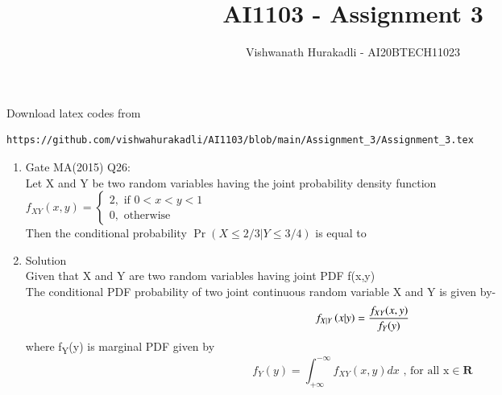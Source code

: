 \documentclass[journal,12pt,twocolumn]{IEEEtran}
\begin{document}
     \def\centbox#1{\makebox[0in]{#1}}
     \def\topbox#1{\raisebox{-\baselineskip}[0in][0in]{#1}}
     \def\midbox#1{\raisebox{-0.5\baselineskip}[0in][0in]{#1}}
\vspace{3cm}
\title{AI1103 - Assignment 3}
\author{Vishwanath Hurakadli - AI20BTECH11023}
\maketitle
\newpage
\bigskip
\renewcommand{\thefigure}{\theenumi}
\renewcommand{\thetable}{\theenumi}
%
Download latex codes from 
%
\begin{lstlisting}
https://github.com/vishwahurakadli/AI1103/blob/main/Assignment_3/Assignment_3.tex
\end{lstlisting}
\begin{enumerate}
\item Gate MA(2015) Q26:\\
Let X and Y be two random variables having the joint probability density function\\
$f_{XY}(x,y)= \begin{cases}
2, \text{ if } 0<x<y<1\\
0,\text{ otherwise }
\end{cases}$\\
Then the conditional probability \(\Pr(X\leqslant2/3|Y\leqslant3/4)\) is equal to
\begin{enumerate}[]
\end{enumerate}
\item Solution\\
Given that X and Y are two random variables having joint PDF f(x,y)\\
The conditional PDF probability of two joint continuous random variable X and Y is given by-   
\begin{align}
f_{X|Y}\left(x|y\right)=\frac{f_{XY}(x,y)}{f_Y(y)}
\end{align}
where f\textsubscript{Y}(y) is marginal PDF given by 
\begin{equation}
f_Y(y)=\int_{+\infty}^{-\infty} f_{XY}(x,y)dx \text{ ,  for all x} \in \mathbf{R}

\end{equation}
\end{enumerate}
\end{document}
